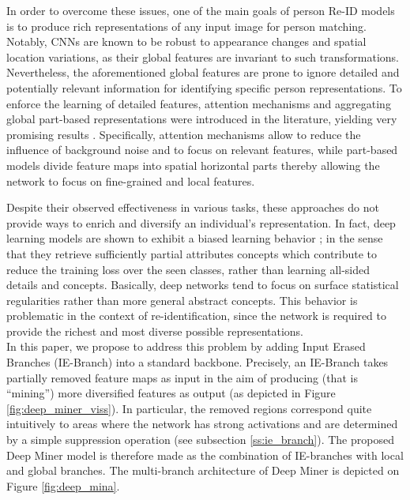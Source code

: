 \documentclass[final]{cvpr}
\begin{document}
In order to overcome these issues, one of the main goals of person Re-ID models is to produce rich representations of any input image for person matching. Notably, CNNs are known to be robust to appearance changes and spatial location variations, as their global features are invariant to such transformations. Nevertheless, the aforementioned global features are prone to ignore detailed and potentially relevant information for identifying specific person representations. To enforce the learning of detailed features, attention mechanisms and aggregating global part-based representations were introduced in the literature, yielding very promising results \cite{chen2019mixed, chen2019abd, sun2018beyond}. Specifically, attention mechanisms allow to reduce the influence of background noise and to focus on relevant features, while part-based models divide feature maps into spatial horizontal parts thereby allowing the network to focus on fine-grained and local features.

Despite their observed effectiveness in various tasks, these approaches do not provide ways to enrich and diversify an individual's representation. In fact, deep learning models are shown to exhibit a biased learning behavior \cite{chen2019hybrid, chen2019energy, tamaazousti2019universal}; in the sense that they retrieve sufficiently partial attributes concepts which contribute to reduce the training loss over the seen classes, rather than learning all-sided details and concepts. Basically, deep networks tend to focus on surface statistical regularities rather than more general abstract concepts. This behavior is problematic in the context of re-identification, since the network is required to provide the richest and most diverse possible representations.\\

In this paper, we propose to address this problem by adding Input Erased Branches (IE-Branch) into a standard backbone. Precisely,  an IE-Branch takes partially removed feature maps as input in the aim of producing (that is ``mining'') more diversified features as output (as depicted in Figure \ref{fig:deep_miner_viss}). In particular, the removed regions correspond quite intuitively to areas where the network has strong activations and are determined by a simple suppression operation (see subsection \ref{ss:ie_branch}).  The proposed Deep Miner model is therefore made as the combination of IE-branches with local and global branches. The multi-branch architecture of Deep Miner is depicted on Figure \ref{fig:deep_mina}.\\
\end{document}
